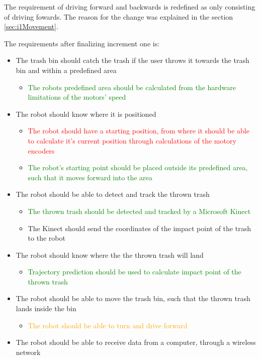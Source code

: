 The requirement of driving forward and backwards is redefined as only consisting of driving fowards. The reason for the change was explained in the section \ref{sec:i1Movement}.

The requirements after finalizing increment one is:
\begin{itemize}
\item The trash bin should catch the trash if the user throws it towards the trash bin and within a predefined area
\begin{itemize}
	\item \textcolor{green}{The robots predefined area should be calculated from the hardware limitations of the motors’ speed}
\end{itemize}
\item The robot should know where it is positioned
\begin{itemize}
	\item \textcolor{red}{The robot should have a starting position, from where it should be able to calculate it's current position through calculations of the motory encoders}
	\item \textcolor{green}{The robot's starting point should be placed outside its predefined area, such that it moves forward into the area}
\end{itemize}
\item The robot should be able to detect and track the thrown trash
\begin{itemize}
	\item \textcolor{green}{The thrown trash should be detected and tracked by a Microsoft Kinect}
	\item The Kinect should send the coordinates of the impact point of the trash to the robot
\end{itemize}
\item The robot should know where the the thrown trash will land
\begin{itemize}
	\item \textcolor{green}{Trajectory prediction should be used to calculate impact point of the thrown trash}
\end{itemize}
\item The robot should be able to move the trash bin, such that the thrown trash lands inside the bin
\begin{itemize}
	\item \textcolor{orange}{The robot should be able to turn and drive forward}
\end{itemize}
\item {The robot should be able to receive data from a computer, through a wireless network}
\end{itemize}
